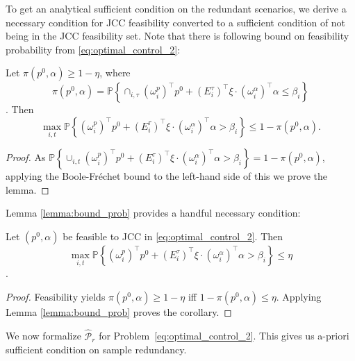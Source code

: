 To get an analytical sufficient condition on the redundant scenarios, we derive a necessary condition for JCC feasibility converted to a sufficient condition of not being in the JCC feasibility set. Note that there is following bound on feasibility probability from \eqref{eq:optimal_control_2}:
\begin{lemma}
    \label{lemma:bound_prob}
     Let $\pi(p^0, \alpha) \geq 1 -\eta$, where $$\pi(p^0, \alpha) = \mathbb{P}\left\{ \cap_{i, \tau} (\omega^p_i)^\top p^0 + (E^\tau_i)^\top \xi \cdot(\omega^\alpha_i)^\top \alpha \leq \beta_i\right\}$$. Then 
    \vspace{-2mm}
    \[\max_{i, t} \mathbb{P} \left\{ (\omega^p_i)^\top p^0 + (E^\tau_i)^\top \xi \cdot (\omega^\alpha_i)^\top \alpha > \beta_i \right\} \leq 1-\pi(p^0, \alpha).\]
\end{lemma}
\begin{proof}
    As $\mathbb{P}\left\{ \cup_{i, t} (\omega^p_i)^\top p^0 + (E^\tau_i)^\top \xi \cdot (\omega^\alpha_i)^\top \alpha > \beta_i \right\} = 1 - \pi(p^0, \alpha)$, applying the Boole-Fréchet bound \cite[Theorem 4.2.1]{williamson1989probabilistic} to the left-hand side of this we prove the lemma.
\end{proof}
Lemma \ref{lemma:bound_prob} provides a handful necessary condition:
\begin{corollary}
    \label{lemma:corollary}
    Let $(p^0, \alpha)$ be feasible to JCC in \eqref{eq:optimal_control_2}. Then $$\max_{i, t} \mathbb{P} \left\{ (\omega^p_i)^\top p^0 + (E^\tau_i)^\top \xi \cdot (\omega^\alpha_i)^\top \alpha > \beta_i \right\} \leq \eta$$.
\end{corollary}
\begin{proof}
    Feasibility yields $\pi(p^0, \alpha) \geq 1 -\eta$ iff $1 - \pi(p^0, \alpha) \leq \eta$. Applying Lemma \ref{lemma:bound_prob} proves the corollary.
\end{proof}


We now formalize $\hat{\mathcal{P}}_r$ for Problem~\eqref{eq:optimal_control_2}. This gives us a-priori sufficient condition on sample redundancy.

